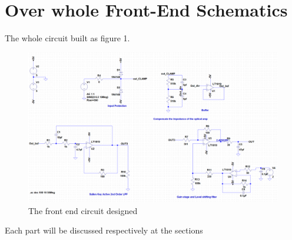 \documentclass[pdftex,12pt,a4paper]{article}
\begin{document}
\section{Over whole Front-End Schematics}
The whole circuit built as figure 1. 
\begin{figure}[H]
\centering
\includegraphics[width=16cm]{Sch.png}
\caption{The front end circuit designed}
\end{figure}
Each part will be discussed respectively at the sections
\end{document}
